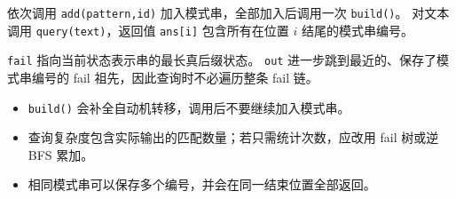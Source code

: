 依次调用 \texttt{add(pattern,id)} 加入模式串，全部加入后调用一次 \texttt{build()}。
对文本调用 \texttt{query(text)}，返回值 \texttt{ans[i]} 包含所有在位置 \(i\) 结尾的模式串编号。

\texttt{fail} 指向当前状态表示串的最长真后缀状态。
\texttt{out} 进一步跳到最近的、保存了模式串编号的 fail 祖先，因此查询时不必遍历整条 fail 链。

\begin{icpcwarning}[使用前确认]
  \begin{itemize}
    \item \texttt{build()} 会补全自动机转移，调用后不要继续加入模式串。
    \item 查询复杂度包含实际输出的匹配数量；若只需统计次数，应改用 fail 树或逆 BFS 累加。
    \item 相同模式串可以保存多个编号，并会在同一结束位置全部返回。
  \end{itemize}
\end{icpcwarning}
